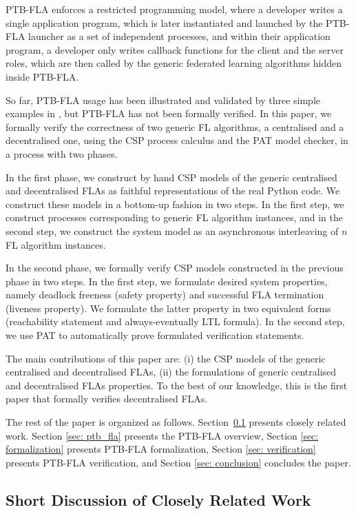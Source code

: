 \documentclass[runningheads]{llncs}
\begin{document}
PTB-FLA enforces a restricted programming model, where a developer writes a single application program, which is later instantiated and launched by the PTB-FLA launcher as a set of independent processes, and within their application program, a developer only writes callback functions for the client and the server roles, which are then called by the generic federated learning algorithms hidden inside PTB-FLA.

So far, PTB-FLA usage has been illustrated and validated by three simple examples in \cite{PopovicPKDG2023}, but PTB-FLA has not been formally verified. In this paper, we formally verify the correctness of two generic FL algorithms, a centralised and a decentralised one, using the CSP process calculus and the PAT model checker, in a process with two phases.

In the first phase, we construct by hand CSP models of the generic centralised and decentralised FLAs as faithful representations of the real Python code. We construct these models in a bottom-up fashion in two steps. In the first step, we construct processes corresponding to generic FL algorithm instances, and in the second step, we construct the system model as an asynchronous interleaving of $n$ FL algorithm instances.

In the second phase, we formally verify CSP models constructed in the previous phase in two steps. In the first step, we formulate desired system properties, namely deadlock freeness (safety property) and successful FLA termination (liveness property). We formulate the latter property in two equivalent forms (reachability statement and always-eventually LTL formula). In the second step, we use PAT to automatically prove formulated verification statements.

The main contributions of this paper are: (i) the CSP models of the generic centralised and decentralised FLAs, (ii) the formulations of generic centralised and decentralised FLAs properties. To the best of our knowledge, this is the first paper that formally verifies decentralised FLAs.

The rest of the paper is organized as follows. Section~\ref{sec: related work} presents closely related work. Section \ref{sec: ptb_fla} presents the PTB-FLA overview, Section \ref{sec: formalization} presents PTB-FLA formalization, Section \ref{sec: verification} presents PTB-FLA verification, and Section \ref{sec: conclusion} concludes the paper.

\subsection{Short Discussion of Closely Related Work}\label{sec: related work}
\end{document}
